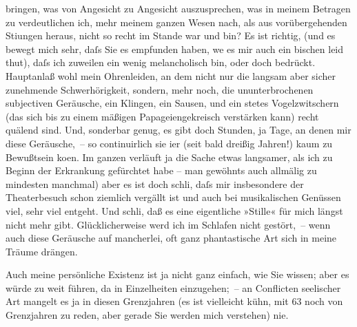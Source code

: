                     bringen, was von Angesicht zu Angesicht auszusprechen, was in meinem Betragen zu
                    verdeutlichen ich, mehr meinem ganzen Wesen nach, als aus vorübergehenden Sti{\geminationm}ungen heraus, nicht so recht im Stande war und
                    bin? Es ist richtig, (und es bewegt mich sehr, daſs Sie es empfunden haben, we{\geminationn} es mir auch ein bischen leid thut), daſs ich {\pb}zuweilen ein wenig melancholisch bin, oder
                    doch bedrückt. Hauptanlaß wohl mein Ohrenleiden, an dem nicht nur die langsam
                    aber sicher zunehmende Schwerhörigkeit, sondern, mehr noch, die ununterbrochenen
                    subjectiven Geräusche, ein Klingen, ein Sausen, und ein \strikeout{\textcolor{gray}{nicht}} stetes Vogelzwitschern (das sich bis zu einem mäßigen Papageiengekreisch
                    verstärken kann) recht quälend sind. Und, sonderbar genug, es gibt doch Stunden,
                    ja Tage, an denen mir diese Geräusche, – so continuirlich sie i{\geminationm}er (seit bald dreißig Jahren!) kaum zu Bewußtsein
                        ko{\geminationm}en. Im ganzen verläuft ja die Sache etwas
                    langsamer, als ich zu Beginn der Erkrankung gefürchtet habe – man gewöhnts auch
                    allmälig \label{T_L02444-1v}\label{T_L02444-1}zu mindesten manchmal) aber es ist doch
                        schli{\geminationm}, daſs mir insbesondere der Theaterbesuch
                    schon ziemlich vergällt ist und auch bei musikalischen Genüssen viel, sehr viel
                    entgeht. Und schli{\geminationm}, {\pb}daß es eine eigentliche »Stille« für mich
                    längst nicht mehr gibt. Glücklicherweise werd ich im Schlafen nicht gestört, –
                    wenn auch diese Geräusche auf mancherlei, oft ganz phantastische Art sich in
                    meine Träume drängen.\pend
           
\pstart
           Auch meine persönliche Existenz ist ja nicht ganz einfach, wie Sie wissen; aber
                    es würde zu weit führen, da in Einzelheiten einzugehen; – an Conflicten
                    seelischer Art mangelt es ja in diesen Grenzjahren (es ist vielleicht kühn, mit
                    63 noch von Grenzjahren zu reden, aber gerade Sie werden mich verstehen)
                    nie.\pend
           
